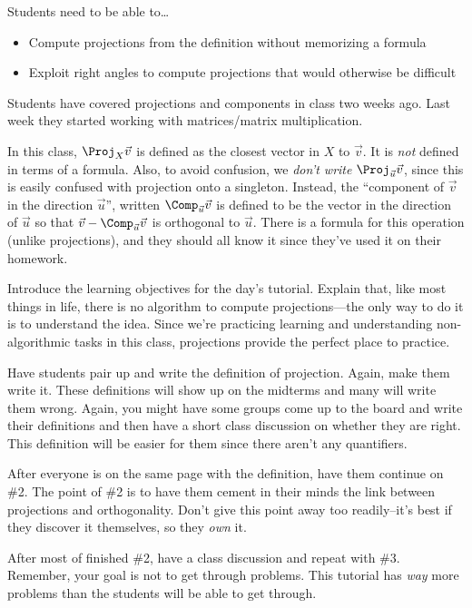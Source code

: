 	Students need to be able to\ldots
	\begin{itemize}
		\item Compute projections from the definition without memorizing a formula
		\item Exploit right angles to compute projections that would otherwise be
			difficult
	\end{itemize}

	Students have covered projections and components in class two weeks ago. Last week they started
		working with matrices/matrix multiplication.

	In this class, $\Proj_X\vec v$ is defined as the closest vector in $X$ to $\vec v$. It is \emph{not}
		defined in terms of a formula. Also, to avoid confusion, we \emph{don't write}
		$\Proj_{\vec u}\vec v$, since this is easily confused with projection onto a singleton.
		Instead, the ``component of $\vec v$ in the direction $\vec u$'', written $\Comp_{\vec u}\vec v$
		is defined to be the vector in the direction of $\vec u$ so that $\vec v-\Comp_{\vec u}\vec v$
		is orthogonal to $\vec u$. There is a formula for this operation (unlike projections), and they
		should all know it since they've used it on their homework.

	Introduce the learning objectives for the day's tutorial. Explain that, like most things in life,
		there is no algorithm to compute projections---the only way to do it is to understand
		the idea. Since we're practicing learning and understanding non-algorithmic tasks in this
		class, projections provide the perfect place to practice.

	Have students pair up and write the definition of projection. Again, make them
		write it. These definitions will show up on the midterms and many will
		write them wrong. Again, you might have some groups come up to the board and
		write their definitions and then have a short class discussion on whether they are right.
		This definition will be easier for them since there aren't any quantifiers.

		After everyone is on the same page with the definition, have them continue on \#2.
		The point of \#2 is to have them cement in their minds the link between projections
		and orthogonality. Don't give this point away too readily--it's best if they discover it themselves, so
		they \emph{own} it.

		After most of finished \#2, have a class discussion and repeat with \#3. Remember, your goal
		is not to get through problems. This tutorial has \emph{way} more problems than the students
		will be able to get through.

